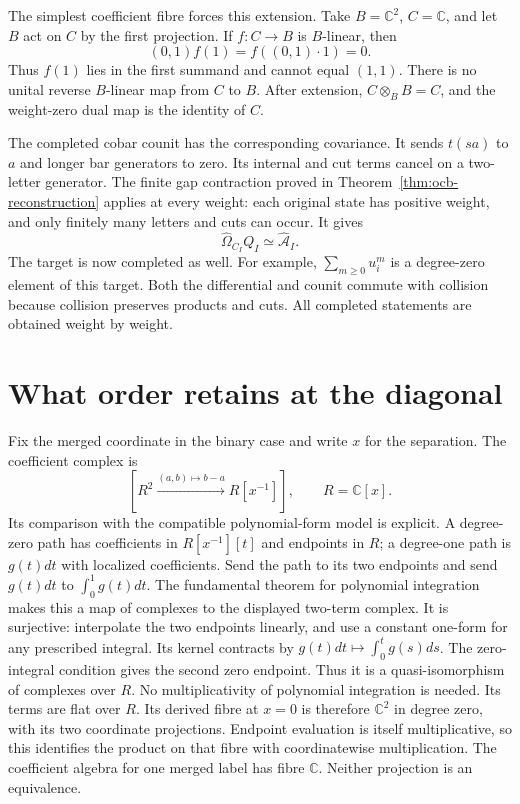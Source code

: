 The simplest coefficient fibre forces this extension.
Take $B=\mathbb C^2$, $C=\mathbb C$, and let $B$ act on $C$
by the first projection.
If $f:C\to B$ is $B$-linear, then
\[
 (0,1)f(1)=f((0,1)\cdot1)=0.
\]
Thus $f(1)$ lies in the first summand and cannot equal $(1,1)$.
There is no unital reverse $B$-linear map from $C$ to $B$.
After extension, $C\otimes_B B=C$, and the weight-zero
dual map is the identity of $C$.

The completed cobar counit has the corresponding covariance.
It sends $t(sa)$ to $a$ and longer bar generators to zero.
Its internal and cut terms cancel on a two-letter generator.
The finite gap contraction proved in
Theorem~\ref{thm:ocb-reconstruction} applies at every weight:
each original state has positive weight, and only finitely many
letters and cuts can occur.
It gives
\[
 \widehat\Omega_{C_I}Q_I\simeq\widehat{\mathcal A}_I.
\]
The target is now completed as well. For example,
$\sum_{m\ge0}u_i^m$ is a degree-zero element of this target.
Both the differential and counit commute with collision because
collision preserves products and cuts.
All completed statements are obtained weight by weight.

\section{What order retains at the diagonal}

Fix the merged coordinate in the binary case and write $x$ for
the separation. The coefficient complex is
\[
 [R^2\xrightarrow{(a,b)\mapsto b-a}R[x^{-1}]],
 \qquad R=\mathbb C[x].
\]
Its comparison with the compatible polynomial-form model is explicit.
A degree-zero path has coefficients in $R[x^{-1}][t]$ and endpoints
in $R$; a degree-one path is $g(t)dt$ with localized coefficients.
Send the path to its two endpoints and send $g(t)dt$ to
$\int_0^1g(t)dt$.
The fundamental theorem for polynomial integration makes this a
map of complexes to the displayed two-term complex.
It is surjective: interpolate the two endpoints linearly, and
use a constant one-form for any prescribed integral.
Its kernel contracts by $g(t)dt\mapsto\int_0^t g(s)ds$.
The zero-integral condition gives the second zero endpoint.
Thus it is a quasi-isomorphism of complexes over $R$.
No multiplicativity of polynomial integration is needed.
Its terms are flat over $R$.
Its derived fibre at $x=0$ is therefore $\mathbb C^2$ in degree
zero, with its two coordinate projections.
Endpoint evaluation is itself multiplicative, so this identifies
the product on that fibre with coordinatewise multiplication.
The coefficient algebra for one merged label has fibre
$\mathbb C$. Neither projection is an equivalence.

